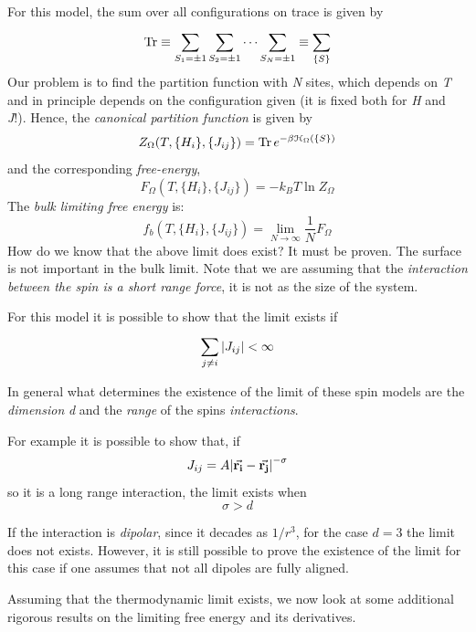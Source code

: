\documentclass[../main/main.tex]{subfiles}
\begin{document}
For this model, the sum over all configurations on trace is given by
\begin{equation*}
  \Tr \equiv \sum_{S_1 = \pm 1}^{}  \sum_{S_2 = \pm 1}^{}  \dots \sum_{S_N = \pm 1}^{} \equiv \sum_{\{ S \}  }^{}
\end{equation*}
 Our problem is to find the partition function with \emph{N} sites, which depends on \emph{T} and in principle depends on the configuration given (it is fixed both for \emph{H} and \emph{J}!).
Hence, the \emph{canonical partition function} is given by
\begin{equation}
  Z_{\Omega } (T, \{ H_i \}, \{ J_{ij} \}    ) = \Tr e^{-\beta \mathcal{H}_ \Omega ( \{ S \}  )}
\end{equation}
and the corresponding \emph{free-energy},
\begin{equation}
  F_ \Omega  (T, \{ H_i \}, \{ J_{ij} \} ) = - k_B T \ln{Z_ \Omega }
\end{equation}
The \emph{bulk limiting free energy} is:
\begin{equation}
  f_b (T, \{ H_i \}, \{ J_{ij} \} ) = \lim_{N \rightarrow \infty }\frac{1}{N}  F_ \Omega  
\end{equation}
How do we know that the above limit does exist? It must be proven. The surface is not important in the bulk limit.
 Note that we are assuming that the \emph{interaction between the spin is a short range force}, it is not as the size of the system.

For this model it is possible to show that the limit exists if
\begin{equation}
  \sum_{j \neq i}^{} \abs{J_{ij}} < \infty
\end{equation}
\begin{remark}
In general what determines the existence of the limit of these spin models are the \emph{dimension} \emph{d} and the \emph{range} of the spins \emph{interactions}.
\end{remark}
For example it is possible to show that, if
\begin{equation}
  J_{ij} = A \abs{\va{r_i}-\va{r_j}  }^{-\sigma}
\end{equation}
so it is a long range interaction, the limit exists when
\begin{equation*}
  \sigma > d
\end{equation*}
\begin{remark}
If the interaction is \emph{dipolar}, since it decades as \( 1/r^3 \), for the case \( d=3 \) the limit does not exists. However, it is still possible to prove the existence of the limit for this case if one assumes that not all dipoles are fully aligned.
\end{remark}
Assuming that the thermodynamic limit exists, we now look at some additional rigorous results on the limiting free energy and its derivatives.
\end{document}
